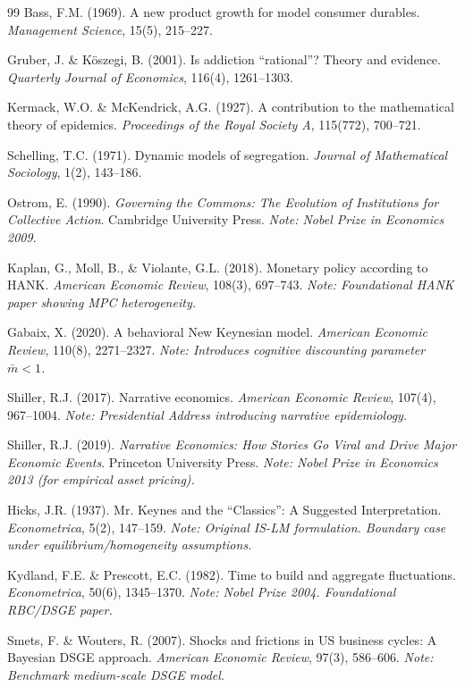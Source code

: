 \begin{thebibliography}{99}
 Bass, F.M. (1969). A new product growth for model consumer durables. \textit{Management Science}, 15(5), 215--227.

 Gruber, J. \& Köszegi, B. (2001). Is addiction ``rational''? Theory and evidence. \textit{Quarterly Journal of Economics}, 116(4), 1261--1303.

 Kermack, W.O. \& McKendrick, A.G. (1927). A contribution to the mathematical theory of epidemics. \textit{Proceedings of the Royal Society A}, 115(772), 700--721.

 Schelling, T.C. (1971). Dynamic models of segregation. \textit{Journal of Mathematical Sociology}, 1(2), 143--186.

 Ostrom, E. (1990). \textit{Governing the Commons: The Evolution of Institutions for Collective Action}. Cambridge University Press. \textit{Note: Nobel Prize in Economics 2009.}

 Kaplan, G., Moll, B., \& Violante, G.L. (2018). Monetary policy according to HANK. \textit{American Economic Review}, 108(3), 697--743. \textit{Note: Foundational HANK paper showing MPC heterogeneity.}

 Gabaix, X. (2020). A behavioral New Keynesian model. \textit{American Economic Review}, 110(8), 2271--2327. \textit{Note: Introduces cognitive discounting parameter $\bar{m} < 1$.}

 Shiller, R.J. (2017). Narrative economics. \textit{American Economic Review}, 107(4), 967--1004. \textit{Note: Presidential Address introducing narrative epidemiology.}

 Shiller, R.J. (2019). \textit{Narrative Economics: How Stories Go Viral and Drive Major Economic Events}. Princeton University Press. \textit{Note: Nobel Prize in Economics 2013 (for empirical asset pricing).}

 Hicks, J.R. (1937). Mr. Keynes and the ``Classics'': A Suggested Interpretation. \textit{Econometrica}, 5(2), 147--159. \textit{Note: Original IS-LM formulation. Boundary case under equilibrium/homogeneity assumptions.}

 Kydland, F.E. \& Prescott, E.C. (1982). Time to build and aggregate fluctuations. \textit{Econometrica}, 50(6), 1345--1370. \textit{Note: Nobel Prize 2004. Foundational RBC/DSGE paper.}

 Smets, F. \& Wouters, R. (2007). Shocks and frictions in US business cycles: A Bayesian DSGE approach. \textit{American Economic Review}, 97(3), 586--606. \textit{Note: Benchmark medium-scale DSGE model.}


\end{thebibliography}
